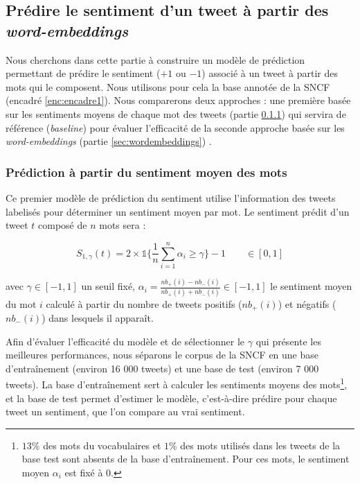 \documentclass[11pt,french,french]{article}
\let\rmarkdownfootnote\footnote%
\def\footnote{\protect\rmarkdownfootnote}
\begin{document}
\subsection{\texorpdfstring{Prédire le sentiment d'un tweet à partir des
\emph{word-embeddings}}{Prédire le sentiment d'un tweet à partir des word-embeddings}}\label{pruxe9dire-le-sentiment-dun-tweet-uxe0-partir-des-word-embeddings}

Nous cherchons dans cette partie à construire un modèle de prédiction
permettant de prédire le sentiment (\(+1\) ou \(-1\)) associé à un tweet
à partir des mots qui le composent. Nous utilisons pour cela la base
annotée de la SNCF (encadré \ref{enc:encadre1}). Nous comparerons deux
approches : une première basée sur les sentiments moyens de chaque mot
des tweets (partie \ref{sec:sentiments}) qui servira de référence
(\emph{baseline}) pour évaluer l'efficacité de la seconde approche basée
sur les \emph{word-embeddings} (partie \ref{sec:wordembeddings}) .

\subsubsection{Prédiction à partir du sentiment moyen des
mots}\label{sec:sentiments}

Ce premier modèle de prédiction du sentiment utilise l'information des
tweets labelisés pour déterminer un sentiment moyen par mot. Le
sentiment prédit d'un tweet \(t\) composé de \(n\) mots sera :

\[S_{1,\gamma}(t) = 2 \times \mathds{1}\{ \frac{1}{n} \sum \limits_{i=1}^n \alpha_i \geq \gamma\} - 1 \qquad \in [0,1]\]

avec \(\gamma \in [-1,1]\) un seuil fixé,
\(\alpha_i = \frac{nb_+(i) - nb_-(i)}{nb_+(i) + nb_-(i)} \in [-1,1]\) le
sentiment moyen du mot \(i\) calculé à partir du nombre de tweets
positifs (\(nb_+(i)\)) et négatifs (\(nb_-(i)\)) dans lesquels il
apparaît.

Afin d'évaluer l'efficacité du modèle et de sélectionner le \(\gamma\)
qui présente les meilleures performances, nous séparons le corpus de la
SNCF en une base d'entraînement (environ 16 000 tweets) et une base de
test (environ 7 000 tweets). La base d'entraînement sert à calculer les
sentiments moyens des mots\footnote{\(13 \%\) des mots du vocabulaires
  et \(1 \%\) des mots utilisés dans les tweets de la base test sont
  absents de la base d'entraînement. Pour ces mots, le sentiment moyen
  \(\alpha_i\) est fixé à 0.}, et la base de test permet d'estimer le
modèle, c'est-à-dire prédire pour chaque tweet un sentiment, que l'on
compare au vrai sentiment.
\end{document}
